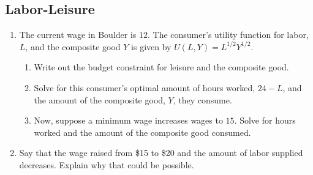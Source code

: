 \documentclass[11pt]{article}
\begin{document}
\subsection*{Labor-Leisure}
\begin{enumerate}
  \item The current wage in Boulder is $12$. The consumer's utility function for labor, $L$, and the composite good $Y$ is given by $U(L, Y) = L^{1/2} Y^{1/2}$. 
  
  \begin{enumerate}
    \item Write out the budget constraint for leisure and the composite good.
    
    \item Solve for this consumer's optimal amount of hours worked, $24 - L$, and the amount of the composite good, $Y$, they consume.
    
    \item Now, suppose a minimum wage increases wages to $15$. Solve for hours worked and the amount of the composite good consumed.
  \end{enumerate}

  \item Say that the wage raised from \$15 to \$20 and the amount of labor supplied decreases. Explain why that could be possible.
\end{enumerate}
\end{document}
